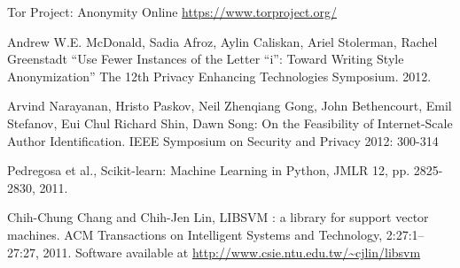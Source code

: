 \documentclass[12pt,letterpaper,onecolumn,oneside]{article}
\numberwithin{equation}{section}
\numberwithin{figure}{section}
\begin{document}
\begin{thebibliography}{1}
\begin{singlespace}

Tor Project: Anonymity Online \url{https://www.torproject.org/}

Andrew W.E. McDonald, Sadia Afroz, Aylin Caliskan, Ariel Stolerman, Rachel Greenstadt ``Use Fewer Instances of the Letter ``i'': Toward Writing Style Anonymization'' The 12th Privacy Enhancing Technologies Symposium. 2012.

Arvind Narayanan, Hristo Paskov, Neil Zhenqiang Gong, John Bethencourt, Emil Stefanov, Eui Chul Richard Shin, Dawn Song: On the Feasibility of Internet-Scale Author Identification. IEEE Symposium on Security and Privacy 2012: 300-314

Pedregosa et al., Scikit-learn: Machine Learning in Python, JMLR 12, pp. 2825-2830, 2011.

Chih-Chung Chang and Chih-Jen Lin, LIBSVM : a library for support vector machines. ACM Transactions on Intelligent Systems and Technology, 2:27:1--27:27, 2011. Software available at \url{http://www.csie.ntu.edu.tw/~cjlin/libsvm}

\end{singlespace}
\end{thebibliography}
\end{document}
